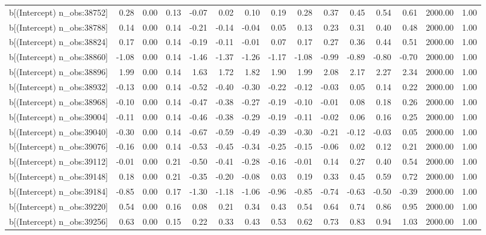 \begin{table}[ht]
\begin{tabular}{rrrrrrrrrrrrrrr}
  b[(Intercept) n\_obs:38752] & 0.28 & 0.00 & 0.13 & -0.07 & 0.02 & 0.10 & 0.19 & 0.28 & 0.37 & 0.45 & 0.54 & 0.61 & 2000.00 & 1.00 \\ 
  b[(Intercept) n\_obs:38788] & 0.14 & 0.00 & 0.14 & -0.21 & -0.14 & -0.04 & 0.05 & 0.13 & 0.23 & 0.31 & 0.40 & 0.48 & 2000.00 & 1.00 \\ 
  b[(Intercept) n\_obs:38824] & 0.17 & 0.00 & 0.14 & -0.19 & -0.11 & -0.01 & 0.07 & 0.17 & 0.27 & 0.36 & 0.44 & 0.51 & 2000.00 & 1.00 \\ 
  b[(Intercept) n\_obs:38860] & -1.08 & 0.00 & 0.14 & -1.46 & -1.37 & -1.26 & -1.17 & -1.08 & -0.99 & -0.89 & -0.80 & -0.70 & 2000.00 & 1.00 \\ 
  b[(Intercept) n\_obs:38896] & 1.99 & 0.00 & 0.14 & 1.63 & 1.72 & 1.82 & 1.90 & 1.99 & 2.08 & 2.17 & 2.27 & 2.34 & 2000.00 & 1.00 \\ 
  b[(Intercept) n\_obs:38932] & -0.13 & 0.00 & 0.14 & -0.52 & -0.40 & -0.30 & -0.22 & -0.12 & -0.03 & 0.05 & 0.14 & 0.22 & 2000.00 & 1.00 \\ 
  b[(Intercept) n\_obs:38968] & -0.10 & 0.00 & 0.14 & -0.47 & -0.38 & -0.27 & -0.19 & -0.10 & -0.01 & 0.08 & 0.18 & 0.26 & 2000.00 & 1.00 \\ 
  b[(Intercept) n\_obs:39004] & -0.11 & 0.00 & 0.14 & -0.46 & -0.38 & -0.29 & -0.19 & -0.11 & -0.02 & 0.06 & 0.16 & 0.25 & 2000.00 & 1.00 \\ 
  b[(Intercept) n\_obs:39040] & -0.30 & 0.00 & 0.14 & -0.67 & -0.59 & -0.49 & -0.39 & -0.30 & -0.21 & -0.12 & -0.03 & 0.05 & 2000.00 & 1.00 \\ 
  b[(Intercept) n\_obs:39076] & -0.16 & 0.00 & 0.14 & -0.53 & -0.45 & -0.34 & -0.25 & -0.15 & -0.06 & 0.02 & 0.12 & 0.21 & 2000.00 & 1.00 \\ 
  b[(Intercept) n\_obs:39112] & -0.01 & 0.00 & 0.21 & -0.50 & -0.41 & -0.28 & -0.16 & -0.01 & 0.14 & 0.27 & 0.40 & 0.54 & 2000.00 & 1.00 \\ 
  b[(Intercept) n\_obs:39148] & 0.18 & 0.00 & 0.21 & -0.35 & -0.20 & -0.08 & 0.03 & 0.19 & 0.33 & 0.45 & 0.59 & 0.72 & 2000.00 & 1.00 \\ 
  b[(Intercept) n\_obs:39184] & -0.85 & 0.00 & 0.17 & -1.30 & -1.18 & -1.06 & -0.96 & -0.85 & -0.74 & -0.63 & -0.50 & -0.39 & 2000.00 & 1.00 \\ 
  b[(Intercept) n\_obs:39220] & 0.54 & 0.00 & 0.16 & 0.08 & 0.21 & 0.34 & 0.43 & 0.54 & 0.64 & 0.74 & 0.86 & 0.95 & 2000.00 & 1.00 \\ 
  b[(Intercept) n\_obs:39256] & 0.63 & 0.00 & 0.15 & 0.22 & 0.33 & 0.43 & 0.53 & 0.62 & 0.73 & 0.83 & 0.94 & 1.03 & 2000.00 & 1.00 \\ 

\end{tabular}
\end{table}
